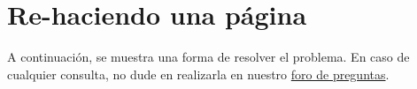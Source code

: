\section{Re-haciendo una página}

A continuación, se muestra una forma de resolver el problema. En caso de cualquier consulta, no dude en realizarla en nuestro \href{https://aula.usm.cl/mod/forum/view.php?id=2654494}{foro de preguntas}.



